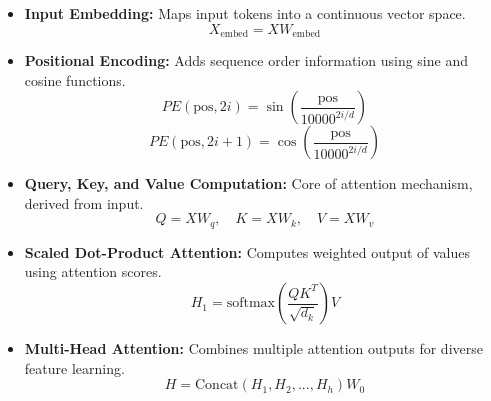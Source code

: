 \begin{itemize}
	\item \textbf{Input Embedding:} Maps input tokens into a continuous vector space.
	\begin{equation}
		X_{\text{embed}} = X W_{\text{embed}}
	\end{equation}
	
	\item \textbf{Positional Encoding:} Adds sequence order information using sine and cosine functions.
	\begin{equation}
		PE(\text{pos}, 2i) = \sin\left(\frac{\text{pos}}{10000^{2i/d}}\right)
	\end{equation}
	\begin{equation}
		PE(\text{pos}, 2i+1) = \cos\left(\frac{\text{pos}}{10000^{2i/d}}\right)
	\end{equation}
	
	\item \textbf{Query, Key, and Value Computation:} Core of attention mechanism, derived from input.
	\begin{equation}
		Q = XW_q,\quad K = XW_k,\quad V = XW_v
	\end{equation}
	
	\item \textbf{Scaled Dot-Product Attention:} Computes weighted output of values using attention scores.
	\begin{equation}
		H_1 = \text{softmax}\left(\frac{QK^T}{\sqrt{d_k}}\right) V
	\end{equation}
	
	\item \textbf{Multi-Head Attention:} Combines multiple attention outputs for diverse feature learning.
	\begin{equation}
		H = \text{Concat}(H_1, H_2, ..., H_h) W_0
	\end{equation}
\end{itemize}









































